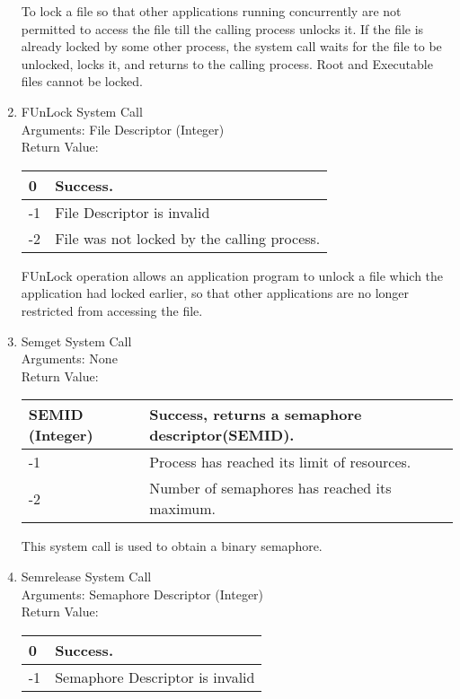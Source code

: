 \begin{enumerate}
To lock a file so that other applications running concurrently are not permitted to access the file till the calling process unlocks it. If the file is already locked by some other process, the system call waits for the file to be unlocked, locks it, and returns to the calling process. Root and Executable files cannot be locked.


\item{FUnLock System Call}
\\
Arguments: File Descriptor (Integer)\\
Return Value:
\FloatBarrier \begin{table}[H]
\centering
\begin{tabular}{|l|l|}
\hline
0	& Success. \\ \hline
-1	& File Descriptor is invalid \\ \hline
-2	& File was not locked by the calling process. \\ \hline
\end{tabular}
\end{table} \FloatBarrier 

FUnLock operation allows an application program to unlock a file which the application had locked earlier, so that other applications are no longer restricted from accessing the file.   
 

\item{Semget System Call}
\\
Arguments: None\\
Return Value:
\FloatBarrier \begin{table}[H]
\centering
\begin{tabular}{|l|l|}
\hline
SEMID (Integer)	& Success, returns a semaphore descriptor(SEMID). \\\hline
-1	& Process has reached its limit of resources. \\ \hline
-2	& Number of semaphores has reached its maximum. \\ \hline
\end{tabular}
\end{table} \FloatBarrier 

This system call is used to obtain a binary semaphore. 

\item{Semrelease System Call}
\\
Arguments: Semaphore Descriptor (Integer)\\
Return Value:
\FloatBarrier \begin{table}[H]
\centering
\begin{tabular}{|l|l|}
\hline
0	& Success. \\\hline
-1	& Semaphore Descriptor is invalid \\ \hline
\end{tabular}
\end{table} \FloatBarrier 


\end{enumerate}
